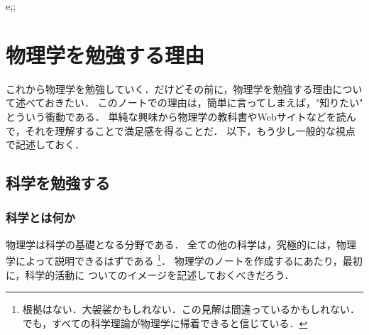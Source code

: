 e;;%
    \section{物理学を勉強する理由}
        \begin{mycomment}
            これから物理学を勉強していく．だけどその前に，物理学を勉強する理由について述べておきたい．
            このノートでの理由は，簡単に言ってしまえば，"知りたい" とういう衝動である．
            単純な興味から物理学の教科書やWebサイトなどを読んで，それを理解することで満足感を得ることだ．
            以下，もう少し一般的な視点で記述しておく．
        \end{mycomment}

        \subsection{科学を勉強する}
        \subsubsection{科学とは何か}
            物理学は科学の基礎となる分野である．
            全ての他の科学は，究極的には，物理学によって説明できるはずである
                \footnote{
                    根拠はない．大袈裟かもしれない．この見解は間違っているかもしれない．
                    でも，すべての科学理論が物理学に帰着できると信じている．
                }．
            物理学のノートを作成するにあたり，最初に，科学的活動に
            ついてのイメージを記述しておくべきだろう．

